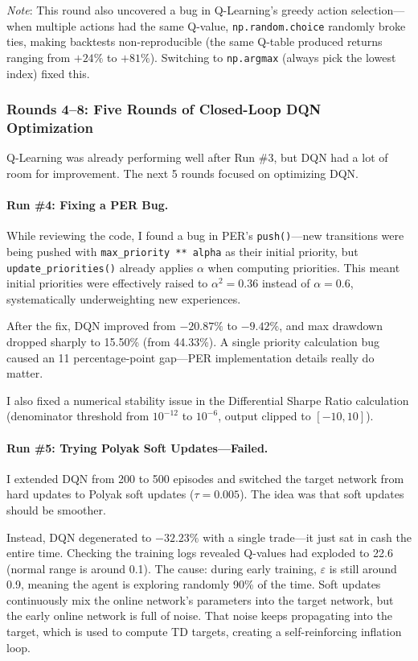 \documentclass[11pt,a4paper]{article}
\begin{document}
\emph{Note}: This round also uncovered a bug in Q-Learning's greedy action selection---when multiple actions had the same Q-value, \texttt{np.random.choice} randomly broke ties, making backtests non-reproducible (the same Q-table produced returns ranging from $+24\%$ to $+81\%$). Switching to \texttt{np.argmax} (always pick the lowest index) fixed this.

\subsubsection{Rounds 4--8: Five Rounds of Closed-Loop DQN Optimization}

Q-Learning was already performing well after Run \#3, but DQN had a lot of room for improvement. The next 5 rounds focused on optimizing DQN.

\paragraph{Run \#4: Fixing a PER Bug.}
While reviewing the code, I found a bug in PER's \texttt{push()}---new transitions were being pushed with \texttt{max\_priority ** alpha} as their initial priority, but \texttt{update\_priorities()} already applies $\alpha$ when computing priorities. This meant initial priorities were effectively raised to $\alpha^2 = 0.36$ instead of $\alpha = 0.6$, systematically underweighting new experiences.

After the fix, DQN improved from $-20.87\%$ to $-9.42\%$, and max drawdown dropped sharply to 15.50\% (from 44.33\%). A single priority calculation bug caused an 11 percentage-point gap---PER implementation details really do matter.

I also fixed a numerical stability issue in the Differential Sharpe Ratio calculation (denominator threshold from $10^{-12}$ to $10^{-6}$, output clipped to $[-10, 10]$).

\paragraph{Run \#5: Trying Polyak Soft Updates---Failed.}
I extended DQN from 200 to 500 episodes and switched the target network from hard updates to Polyak soft updates ($\tau=0.005$). The idea was that soft updates should be smoother.

Instead, DQN degenerated to $-32.23\%$ with a single trade---it just sat in cash the entire time. Checking the training logs revealed Q-values had exploded to 22.6 (normal range is around 0.1). The cause: during early training, $\varepsilon$ is still around 0.9, meaning the agent is exploring randomly 90\% of the time. Soft updates continuously mix the online network's parameters into the target network, but the early online network is full of noise. That noise keeps propagating into the target, which is used to compute TD targets, creating a self-reinforcing inflation loop.
\end{document}
